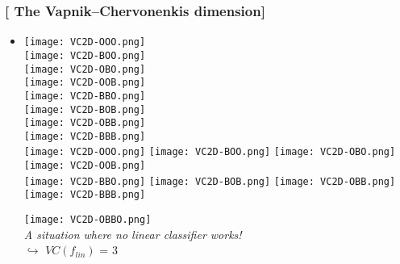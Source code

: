 \documentclass[xcolor=x11names,compress]{beamer}
\renewcommand{\(}{\begin{columns}}
\renewcommand{\)}{\end{columns}}
\newcommand{\<}[1]{\begin{column}{#1}}
\renewcommand{\>}{\end{column}}
\begin{document}
\begin{frame} %
\frametitle{\textcolor{brique}{[ The  Vapnik–Chervonenkis dimension]}}
\pause
\begin{itemize}
  \item[]
    {\texttt{[image: VC2D-OOO.png]} \\ }
    {\texttt{[image: VC2D-BOO.png]} \\ }
    {\texttt{[image: VC2D-OBO.png]} \\ }
    {\texttt{[image: VC2D-OOB.png]}  \\ }
    {\texttt{[image: VC2D-BBO.png]} \\ }
    {\texttt{[image: VC2D-BOB.png]} \\ }
    {\texttt{[image: VC2D-OBB.png]} \\ }
    {\texttt{[image: VC2D-BBB.png]}  \\ }
    { \texttt{[image: VC2D-OOO.png]}
               \texttt{[image: VC2D-BOO.png]}
               \texttt{[image: VC2D-OBO.png]}
               \texttt{[image: VC2D-OOB.png]}\\
               \vspace{1cm}
               \texttt{[image: VC2D-BBO.png]}
               \texttt{[image: VC2D-BOB.png]}
               \texttt{[image: VC2D-OBB.png]}
               \texttt{[image: VC2D-BBB.png]} \\  }

    {\texttt{[image: VC2D-OBBO.png]}  \\ }
    {\emph{A situation where no linear classifier works!} \\
            $\hookrightarrow$ $VC(f_{lin})$ = 3}
\end{itemize}
\end{frame}
\end{document}
